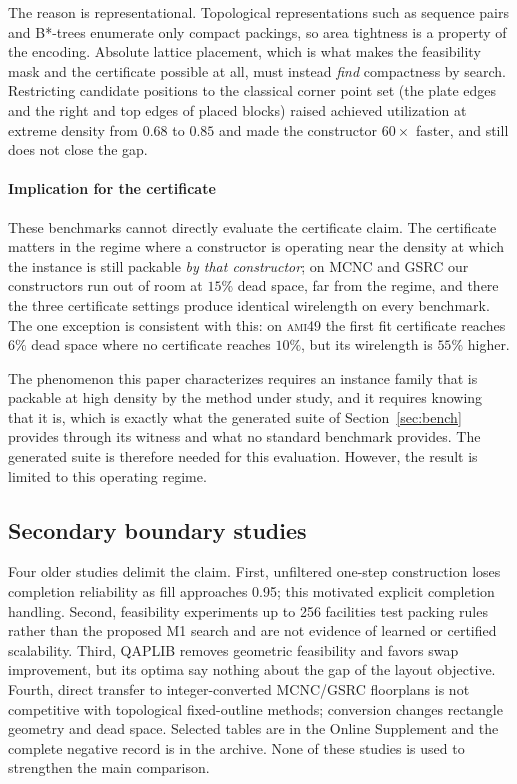 \documentclass[preprint,12pt,authoryear]{elsarticle}
\begin{document}
The reason is representational. Topological representations such as sequence
pairs and B*-trees \citep{Murata1996SequencePair,Chang2000BStar}
enumerate only compact packings, so area tightness is a property of the
encoding. Absolute lattice placement, which is what makes the feasibility mask
and the certificate possible at all, must instead \emph{find} compactness by
search. Restricting candidate positions to the classical corner point set (the
plate edges and the right and top edges of placed blocks) raised achieved
utilization at extreme density from $0.68$ to $0.85$ and made the constructor
$60\times$ faster, and still does not close the gap.

\paragraph{Implication for the certificate}
These benchmarks cannot directly evaluate the certificate claim. The certificate matters in the
regime where a constructor is operating near the density at which the instance is
still packable \emph{by that constructor}; on MCNC and GSRC our constructors run
out of room at $15\%$ dead space, far from the regime, and there the three
certificate settings produce identical wirelength on every benchmark. The one
exception is consistent with this: on \textsc{ami49} the first fit
certificate reaches $6\%$ dead space where no certificate reaches $10\%$, but
its wirelength is $55\%$ higher.

The phenomenon this
paper characterizes requires an instance family that is packable at high density
by the method under study, and it requires knowing that it is, which is exactly
what the generated suite of Section~\ref{sec:bench} provides through its witness
and what no standard benchmark provides. The generated suite is therefore
needed for this evaluation. However, the result is limited to this operating
regime.

\fi

\subsection{Secondary boundary studies}
\label{sec:results_density}
\label{sec:results_scale}
\label{sec:results_qap}
\label{sec:results_mcnc}
Four older studies delimit the claim. First, unfiltered one-step construction
loses completion reliability as fill approaches 0.95; this motivated explicit
completion handling. Second, feasibility experiments up to 256 facilities test
packing rules rather than the proposed M1 search and are not evidence of learned
or certified scalability. Third, QAPLIB removes geometric feasibility and favors
swap improvement, but its optima say nothing about the gap of the layout
objective. Fourth, direct transfer to integer-converted MCNC/GSRC floorplans is
not competitive with topological fixed-outline methods; conversion changes
rectangle geometry and dead space. Selected tables are in the Online Supplement
and the complete negative record is in the archive. None of these studies is
used to strengthen the main comparison.
\end{document}
